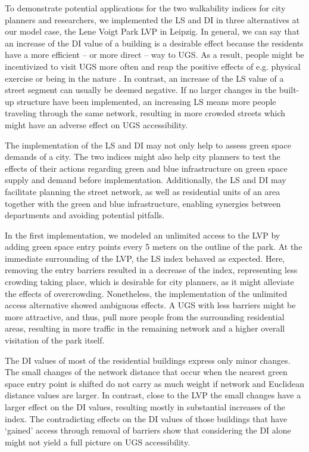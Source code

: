 \documentclass[10pt]{article}
\begin{document}
To demonstrate potential applications for the two walkability indices for city planners and researchers, we implemented the LS and DI in three alternatives at our model case, the Lene Voigt Park LVP in Leipzig.
In general, we can say that an increase of the DI value of a building is a desirable effect because the residents have a more efficient – or more direct – way to UGS.
As a result, people might be incentivized to visit UGS more often and reap the positive effects of e.g. physical exercise or being in the nature \citep{Kabisch.2021}.
In contrast, an increase of the LS value of a street segment can usually be deemed negative. 
If no larger changes in the built-up structure have been implemented, an increasing LS means more people traveling through the same network, resulting in more crowded streets which might have an adverse effect on UGS accessibility.

The implementation of the LS and DI may not only help to assess green space demands of a city.
The two indices might also help city planners to test the effects of their actions regarding green and blue infrastructure on green space supply and demand before implementation. 
Additionally, the LS and DI may facilitate planning the street network, as well as residential units of an area together with the green and blue infrastructure, enabling synergies between departments and avoiding potential pitfalls.

In the first implementation, we modeled an unlimited access to the LVP by adding green space entry points every 5 meters on the outline of the park.
At the immediate surrounding of the LVP, the LS index behaved as expected. 
Here, removing the entry barriers resulted in a decrease of the index, representing less crowding taking place, which is desirable for city planners, as it might alleviate the effects of overcrowding.
Nonetheless, the implementation of the unlimited access alternative showed ambiguous effects.
A UGS with less barriers might be more attractive, and thus, pull more people from the surrounding residential areas, resulting in more traffic in the remaining network and a higher overall visitation of the park itself.

The DI values of most of the residential buildings express only minor changes. 
The small changes of the network distance that occur when the nearest green space entry point is shifted do not carry as much weight if network and Euclidean distance values are larger.
In contrast, close to the LVP the small changes have a larger effect on the DI values, resulting mostly in substantial increases of the index.
The contradicting effects on the DI values of those buildings that have ‘gained’ access through removal of barriers show that considering the DI alone might not yield a full picture on UGS accessibility.
\end{document}
